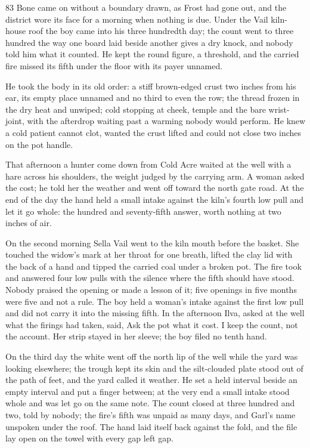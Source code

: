 \begin{CRchronicle}{83}
Bone came on without a boundary drawn, as Frost had gone out, and the district wore its face for a morning when nothing is due. Under the Vail kiln-house roof the boy came into his three hundredth day; the count went to three hundred the way one board laid beside another gives a dry knock, and nobody told him what it counted. He kept the round figure, a threshold, and the carried fire missed its fifth under the floor with its payer unnamed.

He took the body in its old order: a stiff brown-edged crust two inches from his ear, its empty place unnamed and no third to even the row; the thread frozen in the dry heat and unwiped; cold stopping at cheek, temple and the bare wrist-joint, with the afterdrop waiting past a warming nobody would perform. He knew a cold patient cannot clot, wanted the crust lifted and could not close two inches on the pot handle.

That afternoon a hunter come down from Cold Acre waited at the well with a hare across his shoulders, the weight judged by the carrying arm. A woman asked the cost; he told her the weather and went off toward the north gate road. At the end of the day the hand held a small intake against the kiln’s fourth low pull and let it go whole: the hundred and seventy-fifth answer, worth nothing at two inches of air.

On the second morning Sella Vail went to the kiln mouth before the basket. She touched the widow’s mark at her throat for one breath, lifted the clay lid with the back of a hand and tipped the carried coal under a broken pot. The fire took and answered four low pulls with the silence where the fifth should have stood. Nobody praised the opening or made a lesson of it; five openings in five months were five and not a rule. The boy held a woman’s intake against the first low pull and did not carry it into the missing fifth. In the afternoon Ilva, asked at the well what the firings had taken, said, Ask the pot what it cost. I keep the count, not the account. Her strip stayed in her sleeve; the boy filed no tenth hand.

On the third day the white went off the north lip of the well while the yard was looking elsewhere; the trough kept its skin and the silt-clouded plate stood out of the path of feet, and the yard called it weather. He set a held interval beside an empty interval and put a finger between; at the very end a small intake stood whole and was let go on the same note. The count closed at three hundred and two, told by nobody; the fire’s fifth was unpaid as many days, and Garl’s name unspoken under the roof. The hand laid itself back against the fold, and the file lay open on the towel with every gap left gap.
\end{CRchronicle}
